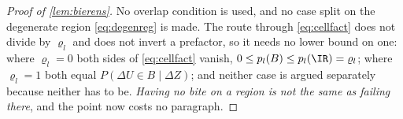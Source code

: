 \begin{proof}[Proof of \cref{lem:bierens}]
No overlap condition is used, and no case split on the degenerate region \eqref{eq:degenreg} is
made. The route through \eqref{eq:cellfact} does not divide by $\varrho_l$ and does not invert a
prefactor, so it needs no lower bound on one: where $\varrho_l=0$ both sides of \eqref{eq:cellfact}
vanish, $0\le p_l(B)\le p_l(\IR)=\varrho_l$; where $\varrho_l=1$ both equal
$P(\Delta U\in B\mid\Delta Z)$; and neither case is argued separately because neither has to be.
\emph{Having no bite on a region is not the same as failing there}, and the point now costs no
paragraph.


\end{proof}

